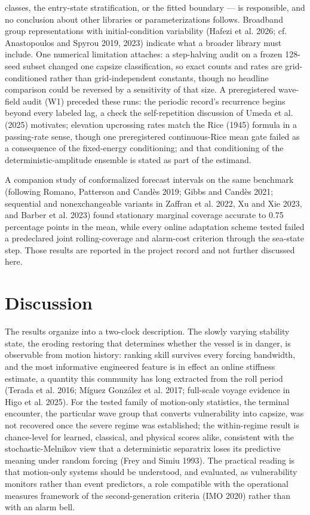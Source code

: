 \documentclass[11pt]{article}
\begin{document}
classes, the entry-state stratification, or the fitted boundary --- is responsible, and no
conclusion about other libraries or parameterizations follows. Broadband group representations
with initial-condition variability (Hafezi et al. 2026; cf. Anastopoulos and Spyrou 2019,
2023) indicate what a broader library must include. One numerical limitation attaches: a
step-halving audit on a frozen 128-seed subset changed one capsize classification, so exact
counts and rates are grid-conditioned rather than grid-independent constants, though no
headline comparison could be reversed by a sensitivity of that size. A preregistered
wave-field audit (W1) preceded these runs: the periodic record's
recurrence begins beyond every labeled lag, a check the self-repetition discussion of Umeda et
al. (2025) motivates; elevation upcrossing rates match the Rice (1945) formula
in a passing-rate sense, though one preregistered continuous-Rice mean gate failed as a
consequence of the fixed-energy conditioning; and that conditioning of the
deterministic-amplitude ensemble is stated as part of the estimand.

A companion study of conformalized forecast intervals on the same benchmark (following Romano,
Patterson and Cand\`es 2019; Gibbs and Cand\`es 2021; sequential and nonexchangeable variants in
Zaffran et al. 2022, Xu and Xie 2023, and Barber et al. 2023) found stationary marginal coverage accurate to
0.75 percentage points in the mean, while every online adaptation scheme tested failed a
predeclared joint rolling-coverage and alarm-cost criterion through the sea-state step. Those
results are reported in the project record and not further discussed here.

\section{Discussion}

The results organize into a two-clock description. The slowly varying stability state, the
eroding restoring that determines whether the vessel is in danger, is observable from motion
history: ranking skill survives every forcing bandwidth, and the most informative engineered
feature is in effect an online stiffness estimate, a quantity this community has long extracted
from the roll period (Terada et al. 2016; M\'iguez Gonz\'alez et al. 2017; full-scale voyage
evidence in Higo et al. 2025). For the tested family of
motion-only statistics, the terminal encounter, the particular wave group that converts
vulnerability into capsize, was not recovered once the severe regime was established; the
within-regime result is chance-level for learned, classical, and physical scores alike, consistent
with the stochastic-Melnikov view that a deterministic separatrix loses its predictive meaning
under random forcing (Frey and Simiu 1993). The practical reading is that motion-only systems should be understood, and
evaluated, as vulnerability monitors rather than event predictors, a role compatible with the
operational measures framework of the second-generation criteria (IMO 2020) rather than with an
alarm bell.
\end{document}
